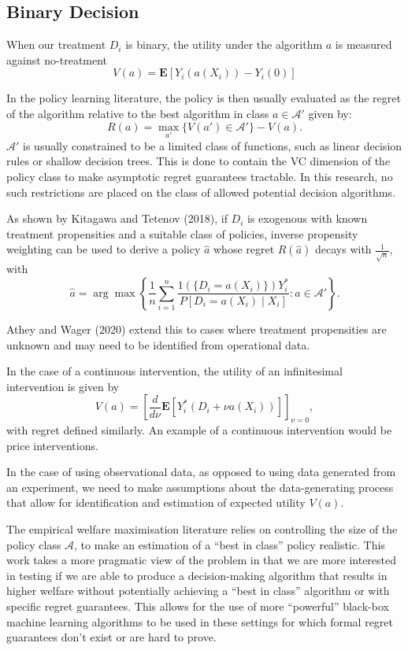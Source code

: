 \documentclass[
]{article}
\begin{document}
\subsection{Binary Decision}

When our treatment \(D_{i}\) is binary, the utility under the algorithm
\(a\) is measured against no-treatment \[
V(a) = \mathbf{E}[Y_{i}(a(X_{i})) - Y_{i}(0)]
\]

In the policy learning literature, the policy is then usually evaluated
as the regret of the algorithm relative to the best algorithm in class
\(a \in \mathcal{A'}\) given by: \[
R(a) = \max_{a'} \{  V(a') \in \mathcal{A'} \} - V(a).
\] \(\mathcal{A'}\) is usually constrained to be a limited class of
functions, such as linear decision rules or shallow decision trees. This
is done to contain the VC dimension of the policy class to make
asymptotic regret guarantees tractable. In this research, no such
restrictions are placed on the class of allowed potential decision
algorithms.

As shown by Kitagawa and Tetenov (2018), if \(D_{i}\) is exogenous with
known treatment propensities and a suitable class of policies, inverse
propensity weighting can be used to derive a policy \(\hat{a}\) whose
regret \(R(\hat{a})\) decays with \(\frac{1}{\sqrt{ n }}\), with \[
\hat{a} = \arg\max \left\{  \frac{1}{n}\sum_{i=1}^n  \frac{1(\{ D_{i} = a(X_{i}) \})Y^*_{i}}{P[D_{i} = a(X_{i}) \mid X_{i}]} : a \in \mathcal{A'} \right\}.
\]

Athey and Wager (2020) extend this to cases where treatment propensities
are unknown and may need to be identified from operational data.

In the case of a continuous intervention, the utility of an
infinitesimal intervention is given by \[
V(a) =  \left[ \frac{d}{d \nu} \mathbf{E}[Y^*_{i}(D_{i} + \nu a(X_{i}))] \right]_{\nu=0},
\] with regret defined similarly. An example of a continuous
intervention would be price interventions.

In the case of using observational data, as opposed to using data
generated from an experiment, we need to make assumptions about the
data-generating process that allow for identification and estimation of
expected utility \(V(a)\).

The empirical welfare maximisation literature relies on controlling the
size of the policy class \(\mathcal{A}\), to make an estimation of a
``best in class'' policy realistic. This work takes a more pragmatic
view of the problem in that we are more interested in testing if we are
able to produce a decision-making algorithm that results in higher
welfare without potentially achieving a ``best in class'' algorithm or
with specific regret guarantees. This allows for the use of more
``powerful'' black-box machine learning algorithms to be used in these
settings for which formal regret guarantees don't exist or are hard to
prove.
\end{document}
